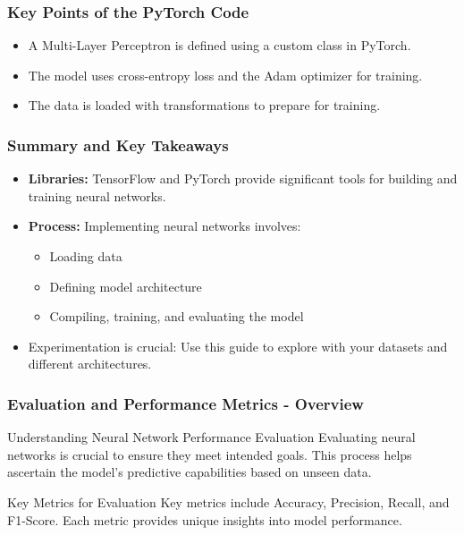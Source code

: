 \documentclass[aspectratio=169]{beamer}
\begin{document}
\begin{frame}
    \frametitle{Key Points of the PyTorch Code}
    \begin{itemize}
        \item A Multi-Layer Perceptron is defined using a custom class in PyTorch.
        \item The model uses cross-entropy loss and the Adam optimizer for training.
        \item The data is loaded with transformations to prepare for training.
    \end{itemize}
\end{frame}

\begin{frame}
    \frametitle{Summary and Key Takeaways}
    \begin{itemize}
        \item \textbf{Libraries:} TensorFlow and PyTorch provide significant tools for building and training neural networks.
        \item \textbf{Process:} Implementing neural networks involves:
        \begin{itemize}
            \item Loading data
            \item Defining model architecture
            \item Compiling, training, and evaluating the model
        \end{itemize}
        \item Experimentation is crucial: Use this guide to explore with your datasets and different architectures.
    \end{itemize}
\end{frame}

\begin{frame}[fragile]
    \frametitle{Evaluation and Performance Metrics - Overview}
    \begin{block}{Understanding Neural Network Performance Evaluation}
        Evaluating neural networks is crucial to ensure they meet intended goals. This process helps ascertain the model's predictive capabilities based on unseen data.
    \end{block}

    \begin{block}{Key Metrics for Evaluation}
        Key metrics include Accuracy, Precision, Recall, and F1-Score. Each metric provides unique insights into model performance.
    \end{block}
\end{frame}
\end{document}

